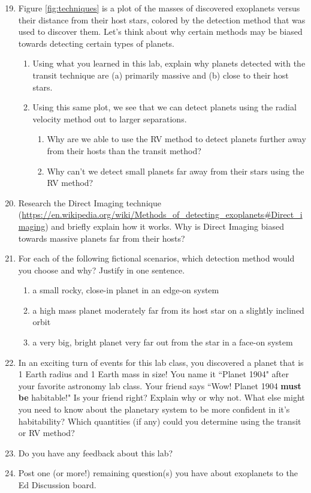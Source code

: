 \documentclass[11pt]{article}
\begin{document}
\begin{enumerate}
\setcounter{enumi}{18}
    \item Figure \ref{fig:techniques} is a plot of the masses of discovered exoplanets versus their distance from their host stars, colored by the detection method that was used to discover them. Let's think about why certain methods may be biased towards detecting certain types of planets.
    \begin{enumerate}
        \item Using what you learned in this lab, explain why planets detected with the transit technique are (a) primarily massive and (b) close to their host stars. %
        \item Using this same plot, we see that we can detect planets using the radial velocity method out to larger separations.
        \begin{enumerate}
            \item Why are we able to use the RV method to detect planets further away from their hosts than the transit method? %
            \item Why can't we detect small planets far away from their stars using the RV method? %
        \end{enumerate}
    \end{enumerate}
    \item Research the Direct Imaging technique (\url{https://en.wikipedia.org/wiki/Methods_of_detecting_exoplanets#Direct_imaging}) and briefly explain how it works.  Why is Direct Imaging biased towards massive planets far from their hosts?
    \item For each of the following fictional scenarios, which detection method would you choose and why? Justify in one sentence.
    \begin{enumerate}
        \item a small rocky, close-in planet in an edge-on system %
        \item a high mass planet moderately far from its host star on a slightly inclined orbit %
        \item a very big, bright planet very far out from the star in a face-on system %
    \end{enumerate}
    \item In an exciting turn of events for this lab class, you discovered a planet that is 1 Earth radius and 1 Earth mass in size! You name it ``Planet 1904" after your favorite astronomy lab class. Your friend says ``Wow! Planet 1904 \textbf{must be} habitable!" Is your friend right? Explain why or why not. What else might you need to know about the planetary system to be more confident in it's habitability?  Which quantities (if any) could you determine using the transit or RV method?
    \item Do you have any feedback about this lab?
    \item Post one (or more!) remaining question(s) you have about exoplanets to the Ed Discussion board.
\end{enumerate}
\end{document}
